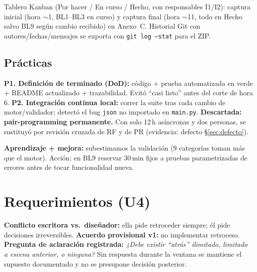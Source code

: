 \documentclass[11pt,a4paper]{article}
\begin{document}
Tablero Kanban (Por hacer / En curso / Hecho, con responsables I1/I2): captura inicial (hora $\sim$1, BL1--BL3 en curso) y captura final (hora $\sim$11, todo en Hecho salvo BL9 seg\'un cambio recibido) en Anexo~C. Historial Git con autores/fechas/mensajes se exporta con \texttt{git log --stat} para el ZIP.

\subsection{Pr\'acticas}
\textbf{P1. Definici\'on de terminado (DoD):} c\'odigo + prueba automatizada en verde + README actualizado + trazabilidad. Evit\'o ``casi listo'' antes del corte de hora 6. \textbf{P2. Integraci\'on continua local:} correr la suite tras cada cambio de motor/validador; detect\'o el bug \texttt{json} no importado en \texttt{main.py}. \textbf{Descartada: pair-programming permanente.} Con solo 12\,h as\'incronas y dos personas, se sustituy\'o por revisi\'on cruzada de RF y de PR (evidencia: defecto \S\ref{sec:defecto}).

\textbf{Aprendizaje + mejora:} subestimamos la validaci\'on (9 categor\'ias toman m\'as que el motor). Acci\'on: en BL9 reservar 30\,min fijos a pruebas parametrizadas de errores antes de tocar funcionalidad nueva.

\section{Requerimientos (U4)}
\textbf{Conflicto escritora vs.\ dise\~nador:} ella pide retroceder siempre; \'el pide decisiones irreversibles. \textbf{Acuerdo provisional v1:} no implementar retroceso. \textbf{Pregunta de aclaraci\'on registrada:} \textit{¿Debe existir ``atr\'as'' ilimitado, limitado a escena anterior, o ninguna?} Sin respuesta durante la ventana se mantiene el supuesto documentado y no se presupone decisi\'on posterior.
\end{document}
